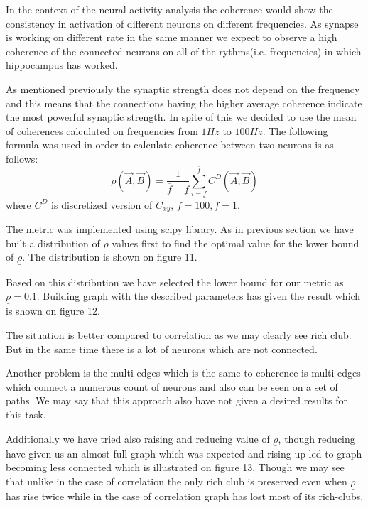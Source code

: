 \documentclass{article}
\begin{document}
	In the context of the neural activity analysis the coherence would show the consistency in activation of different
	neurons on different frequencies. As synapse is working on different rate in the same manner we expect
	to observe a high coherence of the connected neurons on all of the rythms(i.e. frequencies) in which hippocampus
	has worked.

	As mentioned previously the synaptic strength does not depend on the frequency and this means that the connections
	having the higher average coherence indicate the most powerful synaptic strength.
	In spite of this we decided to use the mean of coherences calculated on frequencies from $1Hz$ to $100Hz$.
	The following formula was used in order to calculate coherence between two neurons is as follows:
	\[
		\rho(\vec{A}, \vec{B})=
		\frac{1}{\overline{f} - \underline{f}}
		\sum_{i=\underline{f}}^{\overline{f}}
			C^{D}(\vec{A}, \vec{B})
	\]
	where $C^{D}$ is discretized version of $C_{xy}$, $\overline{f}=100, \underline{f}=1$.

	The metric was implemented using scipy library.
	As in previous section we have built a distribution of $\rho$ values first to find the optimal value for
	the lower bound of $\underline{\rho}$. The distribution is shown on figure 11.

	Based on this distribution we have selected the lower bound for our metric as $\underline{\rho}=0.1$.
	Building graph with the described parameters has given the result which is shown on figure 12.

	The situation is better compared to correlation as we may clearly see rich club.
	But in the same time there
	is a lot of neurons which are not connected.

	Another problem is the multi-edges which is the same to coherence is multi-edges which connect
	a numerous count of neurons and also can be seen on a set of paths. We may say that this approach also
	have not given a desired results for this task.

	Additionally we have tried also raising and reducing value of $\underline{\rho}$, though reducing have
	given us an almost full graph which was expected and rising up led to graph becoming less connected which is illustrated
	on figure 13.
	Though we may see that unlike in the case of correlation the only rich club is preserved even when
	$\underline{\rho}$ has rise twice while in the case of correlation graph has lost most of its rich-clubs.
\end{document}
